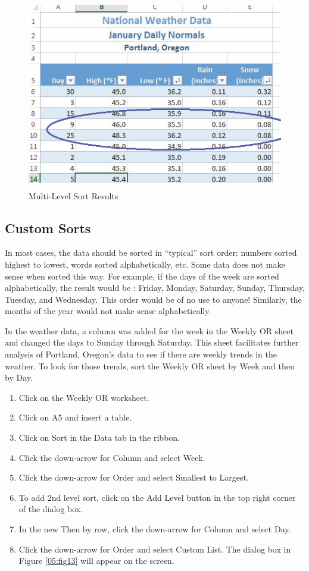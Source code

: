 \begin{figure}[H]
	\centering
	\includegraphics[width=\maxwidth{.95\linewidth}]{gfx/ch05_fig12}
	\caption{Multi-Level Sort Results}
	\label{05:fig12}
\end{figure}

\subsection{Custom Sorts}

In most cases, the data should be sorted in ``typical'' sort order: numbers sorted highest to lowest, words sorted alphabetically, etc. Some data does not make sense when sorted this way. For example, if the days of the week are sorted alphabetically, the result would be : Friday, Monday, Saturday, Sunday, Thursday, Tuesday, and Wednesday. This order would be of no use to anyone! Similarly, the months of the year would not make sense alphabetically.

In the weather data, a column was added for the week in the Weekly OR sheet and changed the days to Sunday through Saturday. This sheet facilitates further analysis of Portland, Oregon's data to see if there are weekly trends in the weather. To look for those trends, sort the Weekly OR sheet by Week and then by Day.

\begin{enumerate}
	\item Click on the Weekly OR worksheet.
\item Click on A5 and insert a table.
\item Click on Sort in the Data tab in the ribbon.
\item Click the down-arrow for Column and select Week.
\item Click the down-arrow for Order and select Smallest to Largest.
\item To add 2nd level sort, click on the Add Level button in the top right corner of the dialog box.
\item In the new Then by row, click the down-arrow for Column and select Day.
\item Click the down-arrow for Order and select Custom List. The dialog box in Figure \ref{05:fig13} will appear on the screen.
\end{enumerate}


